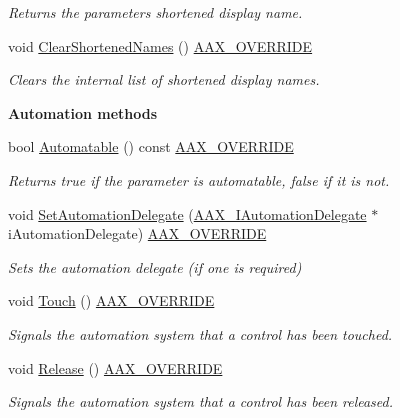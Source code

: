 \begin{Indent}
\begin{DoxyCompactItemize}
\begin{DoxyCompactList}\small\item\em Returns the parameter\textquotesingle{}s shortened display name. \end{DoxyCompactList}\item 
void \mbox{\hyperlink{a01541_a1a3829b633e0eeb8771d2cacc9b1ac70}{Clear\+Shortened\+Names}} () \mbox{\hyperlink{a00392_ac2f24a5172689ae684344abdcce55463}{A\+A\+X\+\_\+\+O\+V\+E\+R\+R\+I\+DE}}
\begin{DoxyCompactList}\small\item\em Clears the internal list of shortened display names. \end{DoxyCompactList}\end{DoxyCompactItemize}
\end{Indent}
\begin{Indent}\textbf{ Automation methods}\par
\begin{DoxyCompactItemize}
\item 
bool \mbox{\hyperlink{a01541_a94d8ff19d89cd2d2024f45f7763abfab}{Automatable}} () const \mbox{\hyperlink{a00392_ac2f24a5172689ae684344abdcce55463}{A\+A\+X\+\_\+\+O\+V\+E\+R\+R\+I\+DE}}
\begin{DoxyCompactList}\small\item\em Returns true if the parameter is automatable, false if it is not. \end{DoxyCompactList}\item 
void \mbox{\hyperlink{a01541_acaf1f39e881c14fb3b81f9c0c23fea31}{Set\+Automation\+Delegate}} (\mbox{\hyperlink{a01773}{A\+A\+X\+\_\+\+I\+Automation\+Delegate}} $\ast$i\+Automation\+Delegate) \mbox{\hyperlink{a00392_ac2f24a5172689ae684344abdcce55463}{A\+A\+X\+\_\+\+O\+V\+E\+R\+R\+I\+DE}}
\begin{DoxyCompactList}\small\item\em Sets the automation delegate (if one is required) \end{DoxyCompactList}\item 
void \mbox{\hyperlink{a01541_a91eda962cdbf1e211a396240c23c0330}{Touch}} () \mbox{\hyperlink{a00392_ac2f24a5172689ae684344abdcce55463}{A\+A\+X\+\_\+\+O\+V\+E\+R\+R\+I\+DE}}
\begin{DoxyCompactList}\small\item\em Signals the automation system that a control has been touched. \end{DoxyCompactList}\item 
void \mbox{\hyperlink{a01541_a815f21974e1a75eb9fdcc5cf3e0704c4}{Release}} () \mbox{\hyperlink{a00392_ac2f24a5172689ae684344abdcce55463}{A\+A\+X\+\_\+\+O\+V\+E\+R\+R\+I\+DE}}
\begin{DoxyCompactList}\small\item\em Signals the automation system that a control has been released. \end{DoxyCompactList}\end{DoxyCompactItemize}
\end{Indent}
